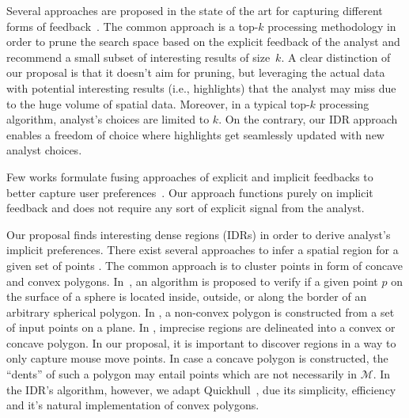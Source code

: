 \documentclass[sigconf,edbt]{acmart-edbt2019}
\begin{document}
\vspace{3pt}
 Several approaches are proposed in the state of the art for capturing different forms of feedback~\cite{bhuiyan2012interactive,xin2006discovering,dimitriadou2016aide,kamat2014distributed,Omidvar-Tehrani:2015,boley2013one}. The common approach is a top-$k$ processing methodology in order to prune the search space based on the explicit feedback of the analyst and recommend a small subset of interesting results of size~$k$. A clear distinction of our proposal is that it doesn't aim for pruning, but leveraging the actual data with potential interesting results (i.e., highlights) that the analyst may miss due to the huge volume of spatial data. Moreover, in a typical top-$k$ processing algorithm, analyst's choices are limited to $k$. On the contrary, our IDR approach enables a freedom of choice where highlights get seamlessly updated with new analyst choices. 

\vspace{2pt}
Few works formulate fusing approaches of explicit and implicit feedbacks to better capture user preferences~\cite{AoidhBW07,Ballatore2008,Liu:2010}. Our approach functions purely on implicit feedback and does not require any sort of explicit signal from the analyst.

\vspace{3pt}
 Our proposal finds interesting dense regions (IDRs) in order to derive analyst's implicit preferences. There exist several approaches to infer a spatial region for a given set of points \cite{Bevis1989,DUCKHAM2008,FADILI2004,ARAMPATZIS2006,Galton2006,Barber:1996}. The common approach is to cluster points in form of concave and convex polygons. In~\cite{Bevis1989}, an algorithm is proposed to verify if a given point $p$ on the surface of a sphere is located inside, outside, or along the border of an arbitrary spherical polygon. In \cite{DUCKHAM2008,FADILI2004}, a non-convex polygon is constructed from a set of input points on a plane. In \cite{ARAMPATZIS2006,Galton2006}, imprecise regions are delineated into a convex or concave polygon. In our proposal, it is important to discover regions in a way to only capture mouse move points. In case a concave polygon is constructed, the ``dents'' of such a polygon may entail points which are not necessarily in $\mathcal{M}$. In the IDR's algorithm, however, we adapt Quickhull~\cite{Barber:1996}, due its simplicity, efficiency and it's natural implementation of convex polygons.
\end{document}
